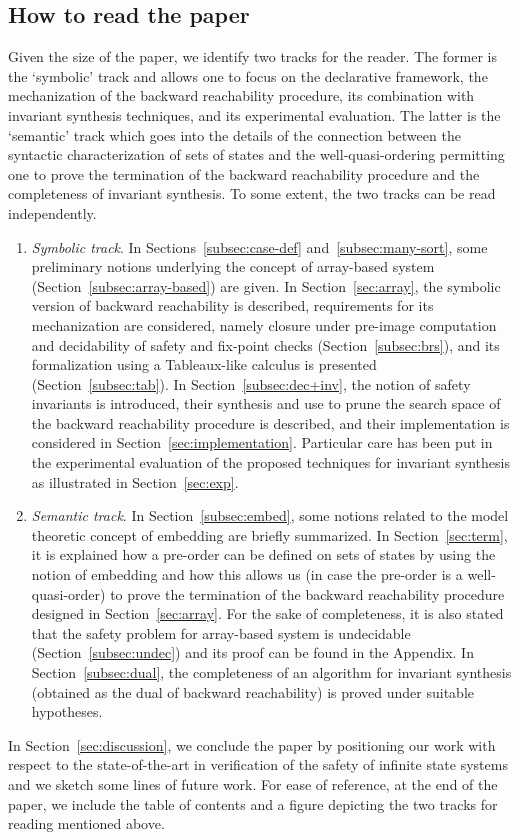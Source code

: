 \documentclass{LMCS}
\theoremstyle{plain}\newtheorem{assumption}[thm]{Assumption}
\theoremstyle{plain}\newtheorem{proposition}[thm]{Proposition}
\theoremstyle{plain}\newtheorem{property}[thm]{Property}
\theoremstyle{plain}\newtheorem{example}[thm]{Example}
\theoremstyle{plain}\newtheorem{claim}[thm]{Claim}
\theoremstyle{plain}\newtheorem{lemma}[thm]{Lemma}
\begin{document}
\subsection*{How to read the paper}

Given the size of the paper, we identify two tracks for the reader.
The former is the `symbolic' track and allows one to focus on the
declarative framework, the mechanization of the backward reachability
procedure, its combination with invariant synthesis techniques, and
its experimental evaluation.  The latter is the `semantic' track which
goes into the details of the connection between the syntactic
characterization of sets of states and the well-quasi-ordering
permitting one to prove the termination of the backward reachability
procedure and the completeness of invariant synthesis.  To some
extent, the two tracks can be read independently.
\begin{enumerate}[$\bullet$]
\item \emph{Symbolic track}.  In Sections~\ref{subsec:case-def}
  and~\ref{subsec:many-sort}, some preliminary notions underlying the
  concept of array-based system (Section~\ref{subsec:array-based}) are
  given.  In Section~\ref{sec:array}, the symbolic version of backward
  reachability is described, requirements for its mechanization are
  considered, namely closure under pre-image computation and
  decidability of safety and fix-point checks
  (Section~\ref{subsec:brs}), and its formalization using a
  Tableaux-like calculus is presented (Section~\ref{subsec:tab}).  In
  Section~\ref{subsec:dec+inv}, the notion of safety invariants is
  introduced, their synthesis and use to prune the search space of the
  backward reachability procedure is described,
and their implementation is
  considered in Section~\ref{sec:implementation}.  Particular care has
  been put in the experimental evaluation of the proposed techniques
  for invariant synthesis as illustrated in Section~\ref{sec:exp}.
\item \emph{Semantic track}.  In Section~\ref{subsec:embed}, some
  notions related to the model theoretic concept of embedding are
  briefly summarized.  In Section~\ref{sec:term}, it is explained how
a pre-order can be defined on sets of states by using the notion of
  embedding and how this allows us (in case the pre-order is a
  well-quasi-order) to prove the termination of the backward
  reachability procedure designed in Section~\ref{sec:array}.  For the
  sake of completeness, it is also stated that the safety problem for
  array-based system is undecidable (Section~\ref{subsec:undec}) and
  its proof can be found in the Appendix.  In
  Section~\ref{subsec:dual}, the completeness of an algorithm for
  invariant synthesis (obtained as the dual of backward reachability)
  is proved under suitable hypotheses.
\end{enumerate}
In Section~\ref{sec:discussion}, we conclude the paper by positioning
our work with respect to the state-of-the-art in verification of the
safety of infinite state systems and we sketch some lines of future
work.  For ease of reference, at the end of the paper, we include the
table of contents and a figure depicting the two tracks for reading
mentioned above.
\end{document}

